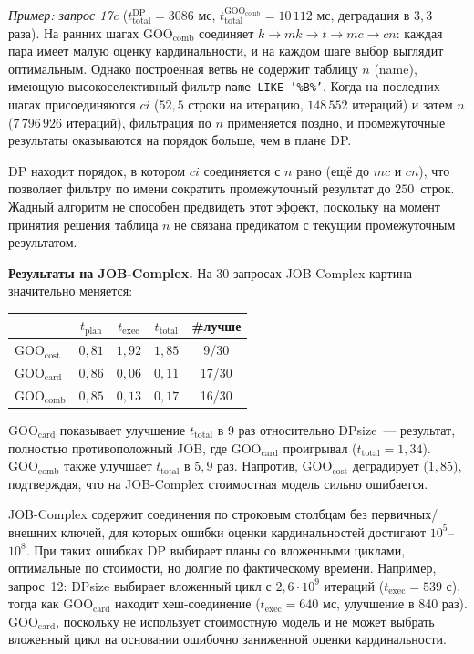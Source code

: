 \textit{Пример: запрос 17c}
($t_{\mathrm{total}}^{\mathrm{DP}} = 3086$ мс,
$t_{\mathrm{total}}^{\mathrm{GOO_{comb}}} = 10\,112$ мс,
деградация в $3{,}3$ раза).
На ранних шагах $\mathrm{GOO_{comb}}$ соединяет $k \to mk \to t \to mc \to cn$:
каждая пара имеет малую оценку кардинальности, и на каждом шаге
выбор выглядит оптимальным.
Однако построенная ветвь не содержит таблицу $n$ (name), имеющую
высокоселективный фильтр \texttt{name LIKE '\%B\%'}.
Когда на последних шагах присоединяются $ci$ ($52{,}5$ строки на итерацию,
$148\,552$ итераций) и затем $n$ ($7\,796\,926$ итераций),
фильтрация по $n$ применяется поздно, и промежуточные результаты
оказываются на порядок больше, чем в плане DP.
\par

DP находит порядок, в котором $ci$ соединяется с $n$ рано
(ещё до $mc$ и $cn$), что позволяет фильтру по имени сократить
промежуточный результат до $250$~строк.
Жадный алгоритм не способен предвидеть этот эффект,
поскольку на момент принятия решения таблица $n$ не связана
предикатом с текущим промежуточным результатом.
\par

\textbf{Результаты на JOB-Complex.}
На 30 запросах JOB-Complex картина значительно меняется:

\begin{center}
\begin{tabular}{l c c c c}
 & $t_{\mathrm{plan}}$ & $t_{\mathrm{exec}}$ & $t_{\mathrm{total}}$ & \#лучше\\
\hline
$\mathrm{GOO_{cost}}$ & $0{,}81$ & $1{,}92$ & $1{,}85$ & 9/30 \\
$\mathrm{GOO_{card}}$ & $0{,}86$ & $0{,}06$ & $0{,}11$ & 17/30 \\
$\mathrm{GOO_{comb}}$ & $0{,}85$ & $0{,}13$ & $0{,}17$ & 16/30 \\
\end{tabular}
\end{center}

$\mathrm{GOO_{card}}$ показывает улучшение $t_{\mathrm{total}}$ в 9 раз
относительно DPsize~--- результат, полностью противоположный JOB,
где $\mathrm{GOO_{card}}$ проигрывал ($t_{\mathrm{total}} = 1{,}34$).
$\mathrm{GOO_{comb}}$ также улучшает $t_{\mathrm{total}}$ в $5{,}9$ раз.
Напротив, $\mathrm{GOO_{cost}}$ деградирует ($1{,}85$), подтверждая, что на JOB-Complex
стоимостная модель сильно ошибается.
\par

JOB-Complex содержит соединения по строковым столбцам без первичных/внешних ключей,
для которых ошибки оценки кардинальностей достигают $10^5$--$10^8$.
При таких ошибках DP выбирает планы со вложенными циклами, оптимальные по стоимости, 
но долгие по фактическому времени.
Например, запрос~12: DPsize выбирает вложенный цикл с $2{,}6 \cdot 10^9$ итераций
($t_{\mathrm{exec}} = 539$ с), тогда как $\mathrm{GOO_{card}}$ находит
хеш-соединение ($t_{\mathrm{exec}} = 640$ мс, улучшение в 840 раз).
$\mathrm{GOO_{card}}$, поскольку не использует
стоимостную модель и не может выбрать вложенный цикл на основании
ошибочно заниженной оценки кардинальности.
\par

